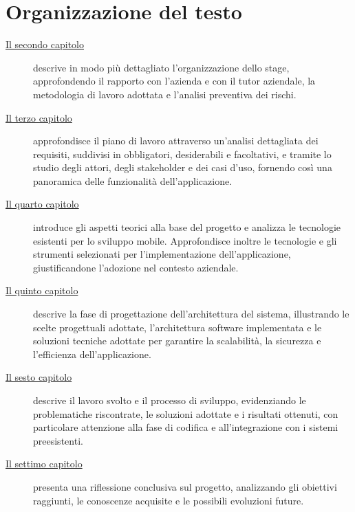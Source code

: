 \section{Organizzazione del testo}
\begin{description}
    \item[{\hyperref[chap:descrizione-stage]{Il secondo capitolo}}] descrive in modo più dettagliato l'organizzazione dello stage, approfondendo il rapporto con l'azienda e con il tutor aziendale, la metodologia di lavoro adottata e l'analisi preventiva dei rischi.
    
    \item[{\hyperref[chap:analisi-requisiti]{Il terzo capitolo}}] approfondisce il piano di lavoro attraverso un'analisi dettagliata dei requisiti, suddivisi in obbligatori, desiderabili e facoltativi, e tramite lo studio degli attori, degli stakeholder e dei casi d'uso, fornendo così una panoramica delle funzionalità dell'applicazione.
    
    \item[{\hyperref[chap:tecnologie-strumenti]{Il quarto capitolo}}] introduce gli aspetti teorici alla base del progetto e analizza le tecnologie esistenti per lo sviluppo mobile. Approfondisce inoltre le tecnologie e gli strumenti selezionati per l'implementazione dell'applicazione, giustificandone l'adozione nel contesto aziendale.
    
    \item[{\hyperref[chap:progettazione-architettura]{Il quinto capitolo}}] descrive la fase di progettazione dell'architettura del sistema, illustrando le scelte progettuali adottate, l'architettura software implementata e le soluzioni tecniche adottate per garantire la scalabilità, la sicurezza e l'efficienza dell'applicazione.

    \item[{\hyperref[chap:sviluppo-implementazione]{Il sesto capitolo}}] descrive il lavoro svolto e il processo di sviluppo, evidenziando le problematiche riscontrate, le soluzioni adottate e i risultati ottenuti, con particolare attenzione alla fase di codifica e all'integrazione con i sistemi preesistenti.
    
    \item[{\hyperref[chap:conclusioni]{Il settimo capitolo}}] presenta una riflessione conclusiva sul progetto, analizzando gli obiettivi raggiunti, le conoscenze acquisite e le possibili evoluzioni future.
\end{description}

